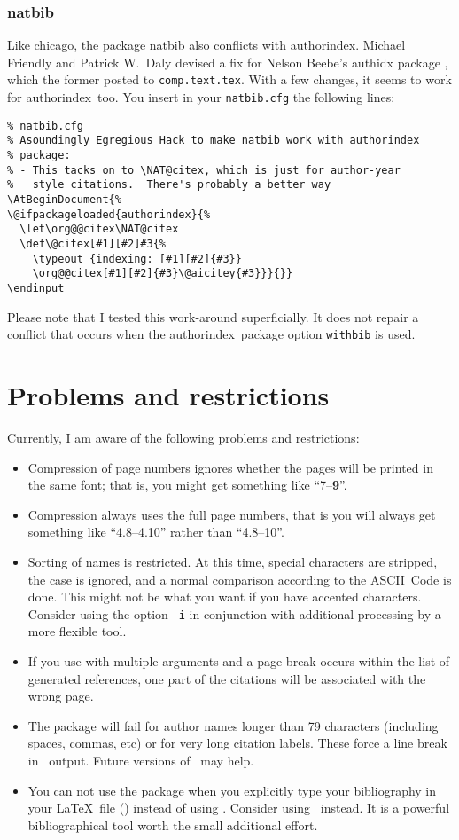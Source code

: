 \documentclass[a4paper]{article}
\newcommand{\package}[1]{\textsf{#1}}
\newcommand{\authorindex}{\package{authorindex}}
\newcommand{\file}[1]{\texttt{#1}}
\newcommand{\cmdline}[1]{\texttt{#1}}
\newcommand{\option}[1]{\cmdline{#1}}
\newcommand{\ltxinp}[1]{\texttt{\string#1}}
\begin{document}
\subsubsection{\package{natbib}}

Like \package{chicago}, the package \package{natbib} also conflicts with
\authorindex.  Michael Friendly and Patrick W.\ Daly devised a fix for Nelson
Beebe's \package{authidx} package \cite{Beebe98}, which the former posted to
\texttt{comp.text.tex}.  With a few changes, it seems to work for \authorindex\ 
too.  You insert in your \file{natbib.cfg} the following lines:
\begin{verbatim}
% natbib.cfg
% Asoundingly Egregious Hack to make natbib work with authorindex
% package:
% - This tacks on to \NAT@citex, which is just for author-year
%   style citations.  There's probably a better way
\AtBeginDocument{%
\@ifpackageloaded{authorindex}{%
  \let\org@@citex\NAT@citex
  \def\@citex[#1][#2]#3{%
    \typeout {indexing: [#1][#2]{#3}}
    \org@@citex[#1][#2]{#3}\@aicitey{#3}}}{}}
\endinput
\end{verbatim}
Please note that I tested this work-around superficially.  It does not repair a
conflict that occurs when the \authorindex\ package option \ltxinp{withbib} is
used.


\section{Problems and restrictions}

Currently, I am aware of the following problems and restrictions:
\begin{itemize}
\item Compression of page numbers ignores whether the pages will be printed in
  the same font; that is, you might get something like ``7--\textbf{9}''.
\item Compression always uses the full page numbers, that is you will always
  get something like ``4.8--4.10'' rather than ``4.8--10''.
\item Sorting of names is restricted.  At this time, special characters are
  stripped, the case is ignored, and a normal comparison according to the
  ASCII~Code is done.  This might not be what you want if you have accented
  characters.  Consider using the option \option{-i} in conjunction with
  additional processing by a more flexible tool.
\item If you use \ltxinp{\aicite} with multiple arguments and a page break
  occurs within the list of generated references, one part of the citations
  will be associated with the wrong page.
\item The package will fail for author names longer than 79 characters
  (including spaces, commas, etc) or for very long citation labels. These force
  a line break in \BibTeX\ output.  Future versions of \BibTeX\ may help.
\item You can not use the package when you explicitly type your bibliography in
  your \LaTeX\ file (\ltxinp{\bibitem}) instead of using \BibTeX. Consider
  using \BibTeX\ instead.  It is a powerful bibliographical tool worth the
  small additional effort.
\end{itemize}
\end{document}
